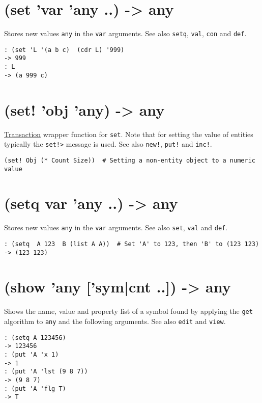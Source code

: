 {{{{{{{{ 
\section{(set 'var 'any ..) -> any}
\label{sec-8-1-19-18}


Stores new values \texttt{any} in the \texttt{var} arguments. See also \texttt{setq}, \texttt{val},
\texttt{con} and \texttt{def}.


\begin{verbatim}
: (set 'L '(a b c)  (cdr L) '999)
-> 999
: L
-> (a 999 c)
\end{verbatim}

 
\section{(set! 'obj 'any) -> any}
\label{sec-8-1-19-19}


\hyperref[ref.html-trans]{Transaction} wrapper function for \texttt{set}. Note that
for setting the value of entities typically the \texttt{set!>} message is used.
See also \texttt{new!}, \texttt{put!} and \texttt{inc!}.


\begin{verbatim}
(set! Obj (* Count Size))  # Setting a non-entity object to a numeric value
\end{verbatim}

 
\section{(setq var 'any ..) -> any}
\label{sec-8-1-19-20}


Stores new values \texttt{any} in the \texttt{var} arguments. See also \texttt{set}, \texttt{val}
and \texttt{def}.


\begin{verbatim}
: (setq  A 123  B (list A A))  # Set 'A' to 123, then 'B' to (123 123)
-> (123 123)
\end{verbatim}

 
\section{(show 'any ['sym|cnt ..]) -> any}
\label{sec-8-1-19-21}


Shows the name, value and property list of a symbol found by applying
the \texttt{get} algorithm to \texttt{any} and the following arguments. See also
\texttt{edit} and \texttt{view}.


\begin{verbatim}
: (setq A 123456)
-> 123456
: (put 'A 'x 1)
-> 1
: (put 'A 'lst (9 8 7))
-> (9 8 7)
: (put 'A 'flg T)
-> T


\end{verbatim}}}}}}}}}
